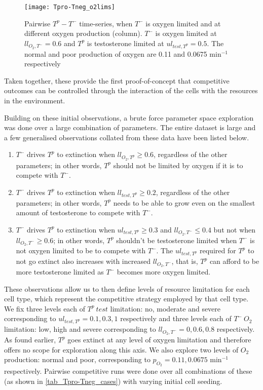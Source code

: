 \begin{figure}[h!]
  \centering
  \texttt{[image: Tpro-Tneg\_o2lims]}
  \caption[Pairwise $T^p - T^-$ time-series, oxygen limitation]{Pairwise $T^p - T^-$ time-series, when $T^-$ is oxygen limited and at different oxygen production (column). $T^-$ is oxygen limited at $ll_{O_2,T^-}=0.6$ and $T^p$ is testosterone limited at $ul_{test,T^p}=0.5$. The normal and poor production of oxygen are 0.11 and 0.0675 min$^{-1}$ respectively}
  \label{fig_Tpro-Tneg_o2lims}
\end{figure}

Taken together, these provide the first proof-of-concept that competitive outcomes can be controlled through the interaction of the cells with the resources in the environment.

\newpage

Building on these initial observations, a brute force parameter space exploration was done over a large combination of parameters. The entire dataset is large and a few generalised observations collated from these data have been listed below.
\begin{enumerate}
  \item $T^-$ drives $T^p$ to extinction when $ll_{O_2,T^p} \geq 0.6$, regardless of the other parameters; in other words, $T^p$ should not be limited by oxygen if it is to compete with $T^-$.
  \item $T^-$ drives $T^p$ to extinction when $ll_{test,T^p} \geq 0.2$, regardless of the other parameters; in other words, $T^p$ needs to be able to grow even on the smallest amount of testosterone to compete with $T^-$.
  \item $T^-$ drives $T^p$ to extinction when $ul_{test,T^p} \geq 0.3$ and $ll_{O_2,T^-} \leq 0.4$ but not when $ll_{O_2,T^-} \geq 0.6$; in other words, $T^p$ shouldn’t be testosterone limited when $T^-$ is not oxygen limited to be to compete with $T^-$. The $ul_{test,T^p}$ required for $T^p$ to not go extinct also increases with increased $ll_{O_2,T^-}$, that is, $T^p$ can afford to be more testosterone limited as $T^-$ becomes more oxygen limited.
\end{enumerate}

These observations allow us to then define levels of resource limitation for each cell type, which represent the competitive strategy employed by that cell type. We fix three levels each of $T^p\ test$ limitation: no, moderate and severe corresponding to $ul_{test,T^p}=0.1, 0.3, 1$ respectively and three levels each of $T^-\ O_2$ limitation: low, high and severe corresponding to $ll_{O_2,T^-}=0, 0.6, 0.8$ respectively. As found earlier, $T^p$ goes extinct at any level of oxygen limitation and therefore offers no scope for exploration along this axis. We also explore two levels of $O_2$ production: normal and poor, corresponding to $p_{O_2}=0.11, 0.0675$ min$^{-1}$ respectively. Pairwise competitive runs were done over all combinations of these (as shown in \autoref{tab_Tpro-Tneg_cases}) with varying initial cell seeding.

